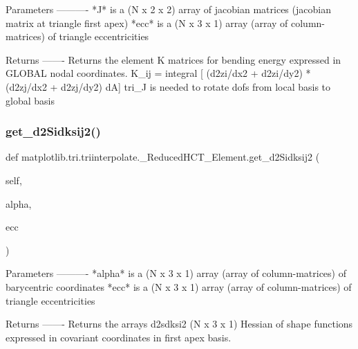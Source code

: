 \begin{DoxyVerb}Parameters
----------
*J* is a (N x 2 x 2) array of jacobian matrices (jacobian matrix at
triangle first apex)
*ecc* is a (N x 3 x 1) array (array of column-matrices) of triangle
eccentricities

Returns
-------
Returns the element K matrices for bending energy expressed in
GLOBAL nodal coordinates.
K_ij = integral [ (d2zi/dx2 + d2zi/dy2) * (d2zj/dx2 + d2zj/dy2) dA]
tri_J is needed to rotate dofs from local basis to global basis
\end{DoxyVerb}
 \mbox{\label{classmatplotlib_1_1tri_1_1triinterpolate_1_1__ReducedHCT__Element_a09c1c4848e269ea62d018b68aef58593}} 
\subsubsection{\texorpdfstring{get\+\_\+d2\+Sidksij2()}{get\_d2Sidksij2()}}
{\footnotesize\ttfamily def matplotlib.\+tri.\+triinterpolate.\+\_\+\+Reduced\+H\+C\+T\+\_\+\+Element.\+get\+\_\+d2\+Sidksij2 (\begin{DoxyParamCaption}\item[{}]{self,  }\item[{}]{alpha,  }\item[{}]{ecc }\end{DoxyParamCaption})}

\begin{DoxyVerb}Parameters
----------
*alpha* is a (N x 3 x 1) array (array of column-matrices) of
barycentric coordinates
*ecc* is a (N x 3 x 1) array (array of column-matrices) of triangle
eccentricities

Returns
-------
Returns the arrays d2sdksi2 (N x 3 x 1) Hessian of shape functions
expressed in covariant coordinates in first apex basis.
\end{DoxyVerb}
 \mbox{\label{classmatplotlib_1_1tri_1_1triinterpolate_1_1__ReducedHCT__Element_a8fcdb80b7f68008f5f0111efa0630c86}} 
